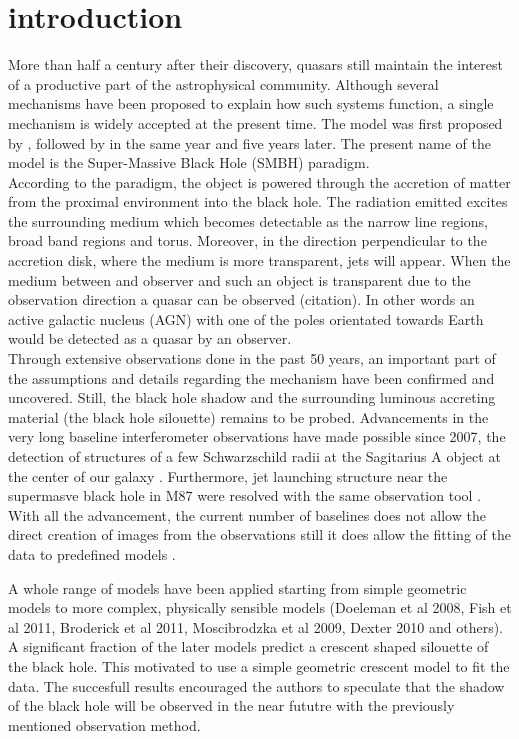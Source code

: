 \section{introduction}
More than half a century after their discovery, quasars still maintain the interest of a productive part of the astrophysical community. Although several mechanisms have been proposed 
to explain how such systems function, a single mechanism is widely accepted at the present time. The model was first proposed by \cite{1964ApJ...140..796S}, followed by \cite{1964SPhD....9..246Z} in the same year and \cite{1969Natur.223..690L} five years later. The present name of the model is the Super-Massive Black Hole (SMBH) paradigm.\\

According to the paradigm, the object is powered through the accretion of matter from the proximal environment into the black hole. The radiation emitted excites the surrounding medium which becomes detectable as the narrow line regions,
broad band regions and torus. Moreover, in the direction perpendicular to the accretion disk, where the medium is more transparent, jets will appear. When the medium between and observer and such an object is transparent due to the observation direction  
a quasar can be observed (citation). In other words an active galactic nucleus (AGN) with one of the poles orientated towards Earth would be detected as a quasar by an observer. \\

Through extensive observations done in the past 50 years, an important part of the assumptions and details  regarding the mechanism have been confirmed and uncovered. Still, the black hole shadow and the surrounding luminous accreting material (the black hole silouette) remains to be probed. Advancements in the very long baseline interferometer observations have made possible since 2007, the detection of structures of a few Schwarzschild radii at the Sagitarius A object at the center of our galaxy \citep{2008JPhCS.131a2055D}. Furthermore, jet launching structure near the supermasve black hole in M87 were resolved with the same observation tool \citep{2012Sci...338..355D}. With all the advancement, the current number of baselines does not allow the direct creation of images from the observations still it does allow the fitting of the data to predefined models \citep{2013MNRAS.434..765K}.


A whole range of models have been applied starting from simple geometric models to more complex, physically sensible models (Doeleman et al 2008, Fish et al 2011, Broderick et al 2011, Moscibrodzka et al 2009, Dexter 2010 and others). A significant fraction of the later models predict a crescent shaped silouette of the black hole. This motivated \cite{2013MNRAS.434..765K} to use a simple geometric crescent model to fit the data. The succesfull results encouraged the authors to speculate that the shadow of the black hole will be observed in the near fututre with the previously mentioned observation method. \\


